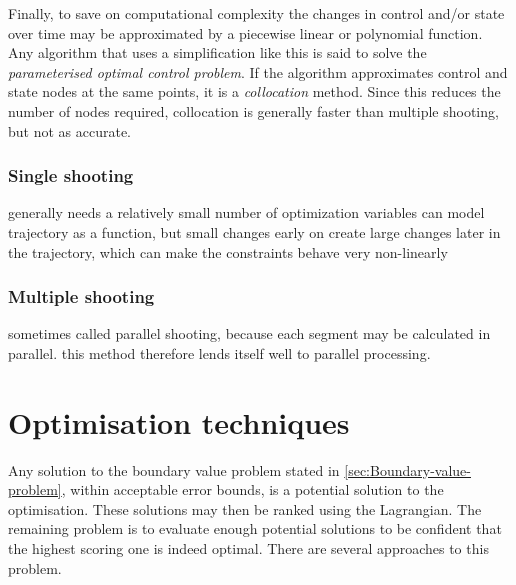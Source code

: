 Finally, to save on computational complexity the changes in control and/or state over time may be approximated by a piecewise linear or polynomial function. Any algorithm that uses a simplification like this is said to solve the \emph{parameterised optimal control problem}. If the algorithm approximates control and state nodes at the same points, it is a \emph{collocation} method. Since this reduces the number of nodes required, collocation is generally faster than multiple shooting, but not as accurate.%

\subsubsection{Single shooting}
generally needs a relatively small number of optimization variables
can model trajectory as a function, but small changes early on create large changes later in the trajectory, which can make the constraints behave very non-linearly \cite{Betts1998}
\subsubsection{Multiple shooting}
sometimes called parallel shooting, because each segment may be calculated in parallel. this method therefore lends itself well to parallel processing.


\section{Optimisation techniques}\label{sec:Techniques}

Any solution to the boundary value problem stated in \autoref{sec:Boundary-value-problem}, within acceptable error bounds, is a potential solution to the optimisation. These solutions may then be ranked using the Lagrangian. The remaining problem is to evaluate enough potential solutions to be confident that the highest scoring one is indeed optimal. There are several approaches to this problem.


